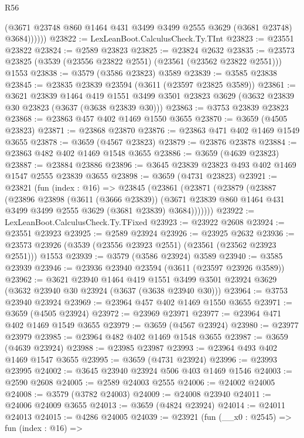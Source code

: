 \begin{lexlean}{R56}
\begin{coremodule}
              (@3671 @23748 @860 @1464 @431 @3499 @3499 @2555 @3629 (@3681 @23748) @3684))))))
@23822 := LexLeanBoot.CalculusCheck.Ty.TInt
@23823 := @23551 @23822
@23824 := @2589 @23823
@23825 := @23824 @2632
@23835 := @23573 @23825 (@3539 (@23556 @23822 @2551) (@23561 (@23562 @23822 @2551))) @1553
@23838 := @3579 (@3586 @23823) @3589
@23839 := @3585 @23838
@23845 := @23835 @23839 @23594 (@3611 (@23597 @23825 @3589))
@23861 := @3621
    @23839
    @1464
    @419
    @1551
    @3499
    @3501
    @23823
    @3629
    (@3632 @23839 @30 @23823 (@3637 (@3638 @23839 @30)))
@23863 := @3753 @23839 @23823
@23868 := @23863 @457 @402 @1469 @1550 @3655
@23870 := @3659 (@4505 @23823)
@23871 := @23868 @23870
@23876 := @23863 @471 @402 @1469 @1549 @3655
@23878 := @3659 (@4567 @23823)
@23879 := @23876 @23878
@23884 := @23863 @482 @402 @1469 @1548 @3655
@23886 := @3659 (@4639 @23823)
@23887 := @23884 @23886
@23896 := @3645 @23839 @23823 @493 @402 @1469 @1547 @2555 @23839 @3655
@23898 := @3659 (@4731 @23823)
@23921 := @23821
    (fun (index : @16) =>
    @23845
      (@23861
        (@23871
          (@23879
            (@23887
              (@23896
                @23898
                (@3611 (@3666 @23839))
                (@3671 @23839 @860 @1464 @431 @3499 @3499 @2555 @3629 (@3681 @23839) @3684)))))))
@23922 := LexLeanBoot.CalculusCheck.Ty.TFixed
@23923 := @23922 @2608
@23924 := @23551 @23923
@23925 := @2589 @23924
@23926 := @23925 @2632
@23936 := @23573 @23926 (@3539 (@23556 @23923 @2551) (@23561 (@23562 @23923 @2551))) @1553
@23939 := @3579 (@3586 @23924) @3589
@23940 := @3585 @23939
@23946 := @23936 @23940 @23594 (@3611 (@23597 @23926 @3589))
@23962 := @3621
    @23940
    @1464
    @419
    @1551
    @3499
    @3501
    @23924
    @3629
    (@3632 @23940 @30 @23924 (@3637 (@3638 @23940 @30)))
@23964 := @3753 @23940 @23924
@23969 := @23964 @457 @402 @1469 @1550 @3655
@23971 := @3659 (@4505 @23924)
@23972 := @23969 @23971
@23977 := @23964 @471 @402 @1469 @1549 @3655
@23979 := @3659 (@4567 @23924)
@23980 := @23977 @23979
@23985 := @23964 @482 @402 @1469 @1548 @3655
@23987 := @3659 (@4639 @23924)
@23988 := @23985 @23987
@23993 := @23964 @493 @402 @1469 @1547 @3655
@23995 := @3659 (@4731 @23924)
@23996 := @23993 @23995
@24002 := @3645 @23940 @23924 @506 @403 @1469 @1546
@24003 := @2590 @2608
@24005 := @2589 @24003 @2555
@24006 := @24002 @24005
@24008 := @3579 (@3782 @24003)
@24009 := @24008 @23940
@24011 := @24006 @24009 @3655
@24013 := @3659 (@4824 @23924)
@24014 := @24011 @24013
@24015 := @4286 @24005
@24039 := @23921
    (fun (__x0 : @2545) =>
    fun (index : @16) =>

\end{coremodule}
\end{lexlean}
